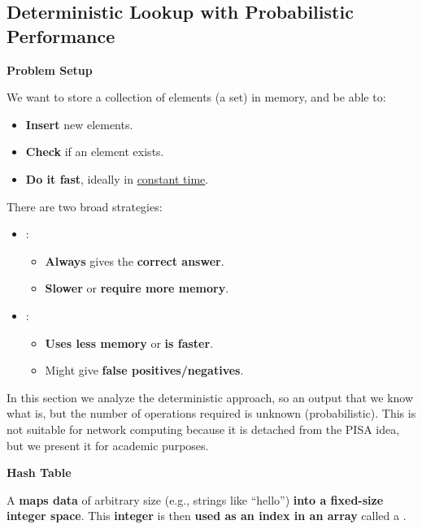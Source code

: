 \subsection{Deterministic Lookup with Probabilistic Performance}

\begin{flushleft}
    \textcolor{Red2}{ \textbf{Problem Setup}}
\end{flushleft}
We want to store a collection of elements (a set) in memory, and be able to:
\begin{itemize}
    \item \textbf{Insert} new elements.
    \item \textbf{Check} if an element exists.
    \item \textbf{Do it fast}, ideally in \underline{constant time}.
\end{itemize}
There are two broad strategies:
\begin{itemize}
    \item {}:
    \begin{itemize}
        \item[\textcolor{Green3}{\faIcon{check}}] \textcolor{Green3}{\textbf{Always}} gives the \textcolor{Green3}{\textbf{correct answer}}.
        \item[\textcolor{Red2}{\faIcon{times}}] \textcolor{Red2}{\textbf{Slower}} or \textcolor{Red2}{\textbf{require more memory}}.
    \end{itemize}
    \item {}:
    \begin{itemize}
        \item[\textcolor{Green3}{\faIcon{check}}] \textcolor{Green3}{\textbf{Uses less memory}} or \textcolor{Green3}{\textbf{is faster}}.
        \item[\textcolor{Red2}{\faIcon{times}}] Might give \textcolor{Red2}{\textbf{false positives/negatives}}.
    \end{itemize}
\end{itemize}
In this section we analyze the deterministic approach, so an output that we know what is, but the number of operations required is unknown (probabilistic). This is not suitable for network computing because it is detached from the PISA idea, but we present it for academic purposes.

\highspace
\begin{flushleft}
    \textcolor{Green3}{ \textbf{Hash Table}}
\end{flushleft}
A  \textbf{maps data} of arbitrary size (e.g., strings like ``hello'') \textbf{into a fixed-size integer space}. This \textbf{integer} is then \textbf{used as an index in an array} called a .

